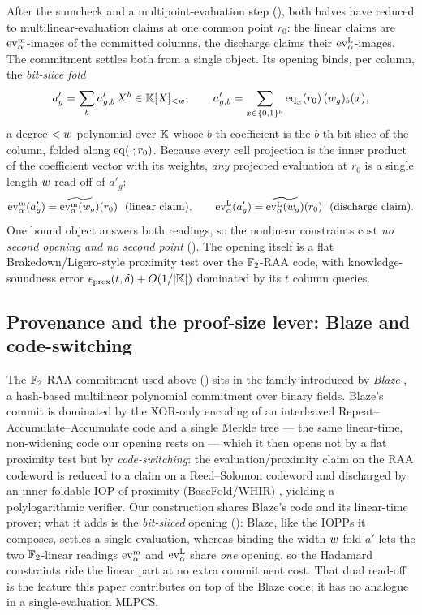 After the sumcheck and a multipoint-evaluation step (),
both halves have reduced to multilinear-evaluation claims at one common
point $r_0$: the linear claims are $\operatorname{ev}^{\mathrm{m}}_{\alpha}$-images of the committed columns,
the discharge claims their $\operatorname{ev}^{\mathrm{L}}_{\alpha}$-images. The commitment settles both from
a single object. Its opening binds, per column, the \emph{bit-slice fold}
\[
  a'_g=\sum_{b}a'_{g,b}\,X^b\in\mathbb{K}[X]_{<w},
  \qquad
  a'_{g,b}=\sum_{x\in\{0,1\}^{\nu}}\operatorname{eq}_x(r_0)\,(w_g)_b(x),
\]
a degree-$<w$ polynomial over $\mathbb{K}$ whose $b$-th coefficient is the
$b$-th bit slice of the column, folded along $\operatorname{eq}(\cdot;r_0)$. Because every
cell projection is the inner product of the coefficient vector with its
weights, \emph{any} projected evaluation at $r_0$ is a single
length-$w$ read-off of $a'_g$:
\[
  \psia(a'_g)=\mle{\psia(w_g)}(r_0)\ \ (\text{linear claim}),
  \qquad
  \psiz(a'_g)=\mle{\psiz(w_g)}(r_0)\ \ (\text{discharge claim}).
\]
One bound object answers both readings, so the nonlinear constraints cost
\emph{no second opening and no second point} (). The
opening itself is a flat Brakedown/Ligero-style proximity test over the
$\mathbb{F}_2$-RAA code, with knowledge-soundness error
$\epsilon_{\mathrm{prox}}(t,\delta)+O(1/|\mathbb{K}|)$ dominated by its $t$ column
queries.

\subsection{Provenance and the proof-size lever: Blaze and code-switching}
\label{sec:overview-blaze}

The $\mathbb{F}_2$-RAA commitment used above
() sits in the family introduced by
\emph{Blaze} \cite{blaze}, a hash-based multilinear polynomial commitment
over binary fields. Blaze's commit is dominated by the XOR-only encoding of
an interleaved Repeat--Accumulate--Accumulate code and a single Merkle tree
--- the same linear-time, non-widening code our opening rests on --- which
it then opens not by a flat proximity test but by \emph{code-switching}: the
evaluation/proximity claim on the RAA codeword is reduced to a claim on a
Reed--Solomon codeword and discharged by an inner foldable IOP of proximity
(BaseFold/WHIR) \cite{basefold,whir}, yielding a polylogarithmic verifier.
Our construction shares Blaze's code and its linear-time prover; what it adds
is the \emph{bit-sliced} opening (): Blaze, like the
IOPPs it composes, settles a single evaluation, whereas binding the
width-$w$ fold $a'$ lets the two $\mathbb{F}_2$-linear readings $\operatorname{ev}^{\mathrm{m}}_{\alpha}$ and
$\operatorname{ev}^{\mathrm{L}}_{\alpha}$ share \emph{one} opening, so the Hadamard constraints ride the linear
part at no extra commitment cost. That dual read-off is the feature this
paper contributes on top of the Blaze code; it has no analogue in a
single-evaluation MLPCS.

